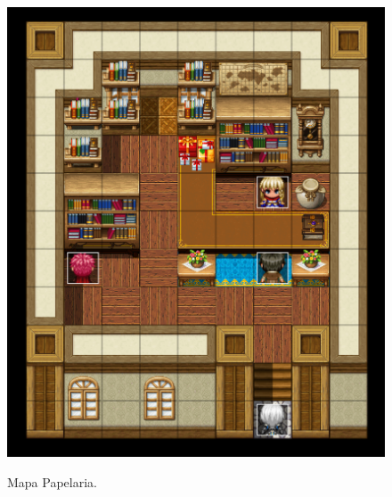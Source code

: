 \begin{figure}[!htbp]
	\centering
	\caption{Mapa Papelaria.}
	\includegraphics[scale=0.45]{Textuais/Pictures/Papelaria_Familia.png}
	\label{fig:papelaria-familia}
\end{figure}

